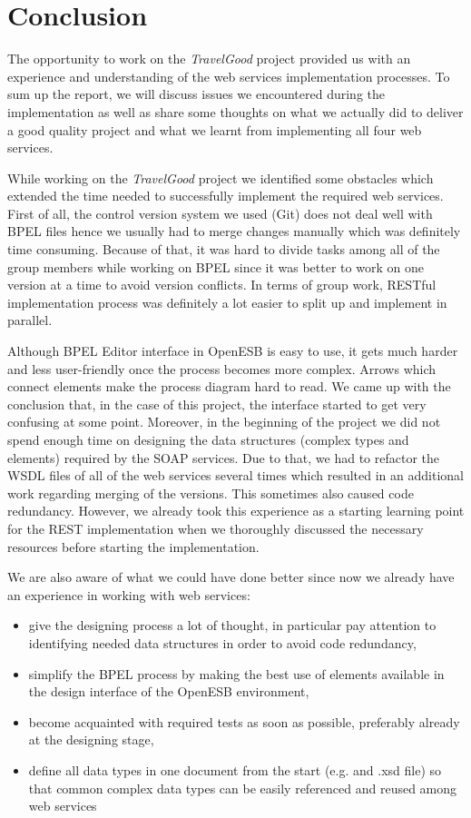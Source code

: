 \section{Conclusion}
The opportunity to work on the \textit{TravelGood} project provided us with an experience and understanding of the web services implementation processes. To sum up the report, we will discuss issues we encountered during the implementation as well as share some thoughts on what we actually did to deliver a good quality project and what we learnt from implementing all four web services.

While working on the \textit{TravelGood} project we identified some obstacles which extended the time needed to successfully implement the required web services. First of all, the control version system we used (Git) does not deal well with BPEL files hence we usually had to merge changes manually which was definitely time consuming. Because of that, it was hard to divide tasks among all of the group members while working on BPEL since it was better to work on one version at a time to avoid version conflicts. In terms of group work, RESTful implementation process was definitely a lot easier to split up and implement in parallel.

Although BPEL Editor interface in OpenESB is easy to use, it gets much harder and less user-friendly once the process becomes more complex. Arrows which connect elements make the process diagram hard to read. We came up with the conclusion that, in the case of this project, the interface started to get very confusing at some point. Moreover, in the beginning of the project we did not spend enough time on designing the data structures (complex types and elements) required by the SOAP services. Due to that, we had to refactor the WSDL files of all of the web services several times which resulted in an additional work regarding merging of the versions. This sometimes also caused code redundancy. However, we already took this experience as a starting learning point for the REST implementation when we thoroughly discussed the necessary resources before starting the implementation.

We are also aware of what we could have done better since now we already have an experience in working with web services:
\begin{itemize}
\item give the designing process a lot of thought, in particular pay attention to identifying needed data structures in order to avoid code redundancy,
\item simplify the BPEL process by making the best use of elements available in the design interface of the OpenESB environment,
\item become acquainted with required tests as soon as possible, preferably already at the designing stage,
\item define all data types in one document from the start (e.g. and .xsd file) so that common complex data types can be easily referenced and reused among web services 
\end{itemize}

